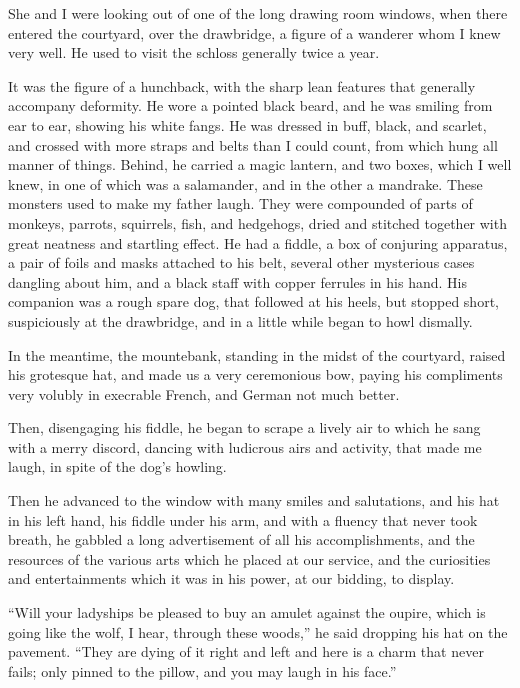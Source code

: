 \documentclass[11pt,twoside,makeidx,hidelinks,]{memoir}
\begin{document}
She and I were looking out of one of the long drawing room windows, when
there entered the courtyard, over the drawbridge, a figure of a wanderer
whom I knew very well. He used to visit the schloss generally twice
a year.

It was the figure of a hunchback, with the sharp lean features that
generally accompany deformity. He wore a pointed black beard, and he was
smiling from ear to ear, showing his white fangs. He was dressed in
buff, black, and scarlet, and crossed with more straps and belts than I
could count, from which hung all manner of things. Behind, he carried a
magic lantern, and two boxes, which I well knew, in one of which was a
salamander, and in the other a mandrake. These monsters used to make my
father laugh. They were compounded of parts of monkeys, parrots,
squirrels, fish, and hedgehogs, dried and stitched together with great
neatness and startling effect. He had a fiddle, a box of conjuring
apparatus, a pair of foils and masks attached to his belt, several other
mysterious cases dangling about him, and a black staff with copper
ferrules in his hand. His companion was a rough spare dog, that followed
at his heels, but stopped short, suspiciously at the drawbridge, and in
a little while began to howl dismally.

In the meantime, the mountebank, standing in the midst of the courtyard,
raised his grotesque hat, and made us a very ceremonious bow, paying his
compliments very volubly in execrable French, and German not
much better.

Then, disengaging his fiddle, he began to scrape a lively air to which
he sang with a merry discord, dancing with ludicrous airs and activity,
that made me laugh, in spite of the dog's howling.

Then he advanced to the window with many smiles and salutations, and
his hat in his left hand, his fiddle under his arm, and with a fluency
that never took breath, he gabbled a long advertisement of all his
accomplishments, and the resources of the various arts which he placed
at our service, and the curiosities and entertainments which it was in
his power, at our bidding, to display.

``Will your ladyships be pleased to buy an amulet against the oupire,
which is going like the wolf, I hear, through these woods,'' he said
dropping his hat on the pavement. ``They are dying of it right and left
and here is a charm that never fails; only pinned to the pillow, and you
may laugh in his face.''
\end{document}
